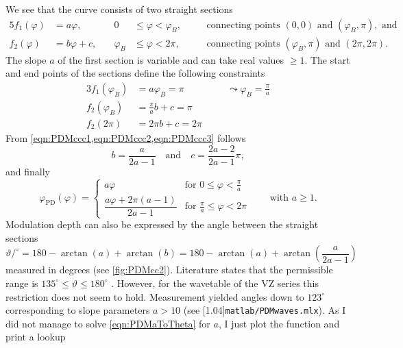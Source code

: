 \documentclass[a4paper]{article}
\newcommand{\TT}[1]{\protect\scalebox{0.75}[1.04]{\texttt{#1}}}
\begin{document}
We see that the curve consists of two straight sections
\begin{alignat}{5}
  f_1(\varphi) &= a\varphi, 
  & \quad 0&\leq\varphi <\varphi_B, 
  && \quad\text{connecting points } (0,0) \text{ and } (\varphi_B,\pi),\text{ and}
\\
  f_2(\varphi) &= b\varphi+c, 
  & \quad \varphi_B&\leq\varphi < 2\pi, 
  && \quad\text{connecting points } (\varphi_B,\pi) \text{ and } (2\pi,2\pi).
\end{alignat}
The slope $a$ of the first section is variable and can take real values $\geq
1$. The start and end points of the sections define the following constraints
\begin{alignat}{3}
  \label{eqn:PDMccc1}
  f_1(\varphi_B) &= a\varphi_B = \pi
  && \quad\leadsto \varphi_B = \frac{\pi}{a}
\\
  \label{eqn:PDMccc2}
  f_2(\varphi_B) &= \frac{\pi}{a}b + c = \pi
\\
  \label{eqn:PDMccc3}
  f_2(2\pi) &= 2\pi b + c = 2\pi
\end{alignat}
From \cref{eqn:PDMccc1,eqn:PDMccc2,eqn:PDMccc3} follows
\begin{equation}
  b = \frac{a}{2a-1}
  \quad\text{and}\quad
  c = \frac{2a-2}{2a-1}\pi,
\end{equation}
and finally
\begin{equation}
  \varphi_{\text{PD}}(\varphi)
  = \begin{cases}
      a\varphi
      & \text{for }0\leq\varphi < \frac{\pi}{a}
    \\[6pt]
      \dfrac{a\varphi+2\pi(a-1)}{2a-1}
      & \text{for }\frac{\pi}{a}\leq\varphi < 2\pi 
    \end{cases}
  \qquad\text{with }a\geq 1.
\end{equation}
Modulation depth can also be expressed by the angle between the straight
sections
\begin{equation}
  \label{eqn:PDMaToTheta}
  \vartheta/^{\circ} 
  = 180-\arctan(a)+\arctan(b)
  = 180-\arctan(a)+\arctan\!\left(\frac{a}{2a-1}\right)
\end{equation}
measured in degrees (see \cref{fig:PDMcc2}). Literature states that the
permissible range is $135^\circ\leq\vartheta\leq 180^\circ$ \cite{Ger09}.
However, for the wavetable of the VZ series this restriction does not seem to
hold. Measurement yielded angles down to $123^\circ$ corresponding to slope
parameters $a>10$ (see \TT{matlab/PDMwaves.mlx}). As I did not manage to solve
\cref{eqn:PDMaToTheta} for $a$, I just plot the function and print a lookup
\end{document}

